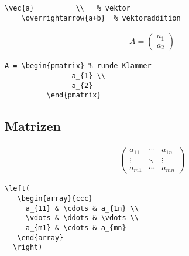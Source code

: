 \lstset{language=[LaTeX]TeX } %
\begin{lstlisting}[gobble=2, frame=none, numbers=none, backgroundcolor=\color{white},%
	caption={},label={code:}]
	\vec{a}          \\   % vektor
	\overrightarrow{a+b}  % vektoraddition
\end{lstlisting}


\begin{align}
A = \begin{pmatrix} %
			a_{1} \\
			a_{2}
	  \end{pmatrix}
\end{align}

\lstset{language=[LaTeX]TeX } %
\begin{lstlisting}[gobble=2, frame=none, numbers=none, backgroundcolor=\color{white},%
	caption={},label={code:}]
	A = \begin{pmatrix} % runde Klammer
				a_{1} \\
				a_{2}
		  \end{pmatrix}
\end{lstlisting}


\subsection{Matrizen}\label{matrizen}

\begin{align}
  \left(
   \begin{array}{ccc}
     a_{11} & \cdots & a_{1n} \\
     \vdots & \ddots & \vdots \\
     a_{m1} & \cdots & a_{mn}
   \end{array}
  \right)
\end{align}

\lstset{language=[LaTeX]TeX } %
\begin{lstlisting}[gobble=2, frame=none, numbers=none, backgroundcolor=\color{white},%
	caption={},label={code:}]
	\left(
   \begin{array}{ccc}
     a_{11} & \cdots & a_{1n} \\
     \vdots & \ddots & \vdots \\
     a_{m1} & \cdots & a_{mn}
   \end{array}
  \right)
\end{lstlisting}

